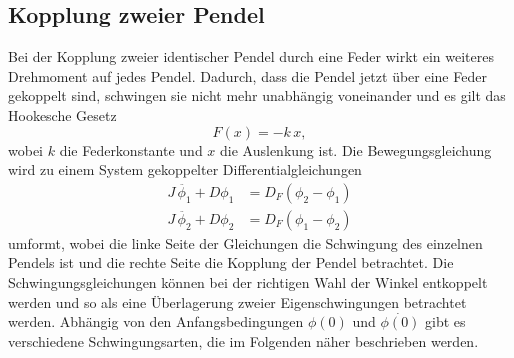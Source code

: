 \subsection{Kopplung zweier Pendel} %
\label{subsec:Schwingungen}
 Bei der Kopplung zweier identischer Pendel durch eine Feder wirkt ein weiteres Drehmoment auf jedes Pendel.
 Dadurch, dass die Pendel jetzt über eine Feder gekoppelt sind, schwingen sie nicht mehr unabhängig voneinander und es gilt das Hookesche Gesetz
 \begin{equation*}
     F(x) = -k \, x ,
 \end{equation*}
 wobei $k$ die Federkonstante und $x$ die Auslenkung ist.
 Die Bewegungsgleichung wird zu einem System gekoppelter Differentialgleichungen
 \begin{align}
     J \, \ddot{\phi_1} + D \phi_1 &= D_F (\phi_2 - \phi_1) \\
     J \, \ddot{\phi_2} + D \phi_2 &= D_F (\phi_1 - \phi_2)
 \end{align}
 umformt, wobei die linke Seite der Gleichungen die Schwingung des einzelnen Pendels ist und die rechte Seite die Kopplung der Pendel betrachtet.
 Die Schwingungsgleichungen können bei der richtigen Wahl der Winkel entkoppelt werden und so als eine Überlagerung zweier Eigenschwingungen betrachtet werden.
 Abhängig von den Anfangsbedingungen $\phi(0)$ und $\dot{\phi(0)}$ gibt es verschiedene Schwingungsarten, die im Folgenden näher beschrieben werden.

